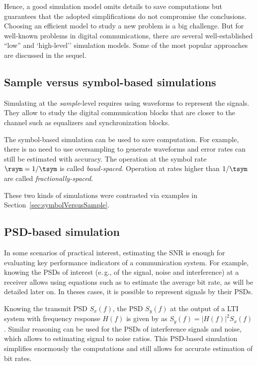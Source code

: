 Hence, a good simulation model omits details to save computations but guarantees that the adopted simplifications do not compromise the conclusions. Choosing an efficient model to study a new problem is a big challenge. But for well-known problems in digital communications, 
there are several well-established ``low'' and `high-level'' simulation models. Some of the most popular approaches are discussed in the sequel.

\subsection{Sample versus symbol-based simulations}
																										
Simulating at the \emph{sample}-level requires using waveforms to represent the signals. They allow to study the digital communication blocks that are closer to the channel such as equalizers and synchronization blocks.

The symbol-based simulation can be used to save computation. For example, there is no need to use oversampling to generate waveforms and error rates can still be estimated with accuracy. The operation at the symbol rate $\rsym=1/\tsym$  is called \emph{baud-spaced}. Operation at rates higher than $1/\tsym$ are called \emph{fractionally-spaced}.

These two kinds of simulations were contrasted via examples in Section~\ref{sec:symbolVersusSample}.

\subsection{PSD-based simulation}

In some scenarios of practical interest, estimating the SNR is enough for evaluating key
performance indicators of a communication system.
For example, knowing the PSDs of interest (e.\,g., of the signal, noise and interference) at a receiver allows
using equations such as  to estimate the average bit rate, as will be detailed later on. In theses cases, 
it is possible to represent signals by their PSDs. 

Knowing the transmit PSD $S_x(f)$, the PSD $S_y(f)$ at the output of a LTI system with frequency response $H(f)$ is given by  as $S_y(f)=|H(f)|^2 S_x(f)$. Similar reasoning can be used for the PSDs of interference signals and noise, which allows to estimating signal to noise ratios.
This PSD-based simulation simplifies enormously the computations and still allows for accurate estimation of bit rates. 

